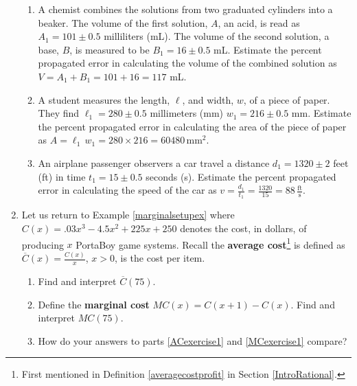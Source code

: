 \documentclass{ximera}
\begin{document}
\begin{enumerate}
\begin{enumerate}

\item  A chemist combines the solutions from two graduated cylinders into a beaker.  The volume of the first solution, $A$, an acid,  is read as $A_{1} = 101 \pm 0.5$ milliliters (mL). The volume of the second solution,  a base, $B$,  is measured to be $B_{1} = 16 \pm 0.5$ mL.    Estimate the percent propagated error in calculating the volume of the combined solution as $V = A_{1} + B_{1} = 101 + 16 = 117$ mL.

\item  A student measures the length, $\ell$, and width, $w$,  of a piece of paper.  They find  $\ell_{1} = 280 \pm 0.5$ millimeters (mm) $w_{1} = 216 \pm 0.5$ mm.    Estimate the percent propagated error in calculating the area of the piece of paper as $A = \ell_{1} \, w_{1} = 280 \times 216 = 60480 \, \text{mm}^2$.

\item  An airplane passenger  observers a car travel a distance $d_{1} = 1320 \pm 2$ feet (ft) in time $t_{1}  = 15 \pm 0.5$ seconds (s).  Estimate the percent propagated error in calculating the speed of the car as $v = \frac{d_{1}}{t_{1}} = \frac{1320}{15} = 88 \, \frac{\text{ft}}{\text{s}}$.

\end{enumerate}

\item\label{AverageCostMarginalCostExercise} Let us return to Example \ref{marginalsetupex} where  $C(x) = .03x^{3} - 4.5x^{2} + 225x + 250$ denotes the cost, in dollars,  of producing $x$ PortaBoy game systems. Recall the \textbf{average cost}\footnote{First mentioned in Definition \ref{averagecostprofit} in Section \ref{IntroRational}.} is defined as $\overline{C}(x) = \frac{C(x)}{x}$, $x > 0$,  is the cost per item.

\begin{enumerate}

\item\label{ACexercise1} Find and interpret $\overline{C}(75)$.

\item\label{MCexercise1}  Define  the \textbf{marginal cost} $MC(x) = C(x+1) - C(x)$.   Find and interpret $MC(75)$.

\item  How do your answers to parts \ref{ACexercise1} and \ref{MCexercise1} compare?


\end{enumerate}
\end{enumerate}
\end{document}
